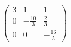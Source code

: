 \documentclass[preview]{standalone}
\begin{document}
\begin{align*}
\begin{pmatrix}3 & 1 & 1\\0 & -\frac{10}{3} & \frac{2}{3}\\0 & 0 & -\frac{16}{5}\end{pmatrix}
\end{align*}
\end{document}
